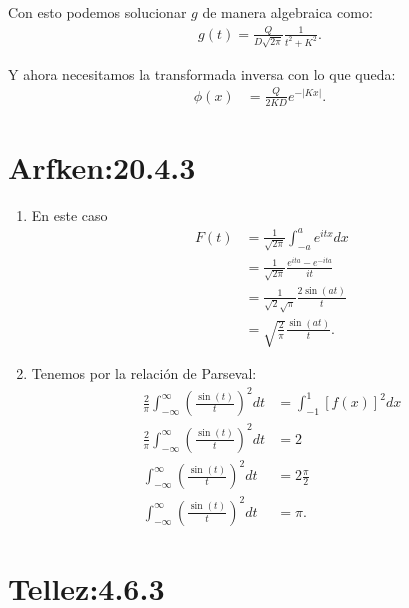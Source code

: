 \documentclass{report}
\begin{document}
Con esto podemos solucionar $g$ de manera algebraica como:
\begin{align*}
  g\left( t \right) = \frac{Q}{D\sqrt{2\pi} }\frac{1}{t^2 + K^2}
.\end{align*}

Y ahora necesitamos la transformada inversa con lo que queda:
\begin{align*}
  \phi\left( x \right) &= \frac{Q}{2K D}e^{-\left| Kx \right| }
.\end{align*}

\chapter{Arfken:20.4.3}

\begin{enumerate}
  \item En este caso
    \begin{align*}
      F\left( t \right) &= \frac{1}{\sqrt{2\pi} }\int_{-a}^{a} e^{itx}dx \\
      &= \frac{1}{\sqrt{2\pi} } \frac{e^{ita}- e^{-ita}}{it} \\
      &= \frac{1}{\sqrt{2} \sqrt{\pi} }\frac{2 \sin\left( at \right) }{t} \\
      &= \sqrt{\frac{2}{\pi}}\frac{\sin\left( at \right) }{t} 
    .\end{align*}
  \item Tenemos por la relación de Parseval:
    \begin{align*}
      \frac{2}{\pi}\int_{-\infty}^{\infty} \left( \frac{\sin\left( t \right) }{t} \right)^2 dt &= \int_{-1}^{1}\left[ f\left( x \right)  \right]^2 dx \\
      \frac{2}{\pi}\int_{-\infty}^{\infty} \left( \frac{\sin\left( t \right) }{t} \right)^2 dt &= 2\\
      \int_{-\infty}^{\infty} \left( \frac{\sin\left( t \right) }{t} \right)^2 dt &= 2 \frac{\pi}{2}\\
      \int_{-\infty}^{\infty} \left( \frac{\sin\left( t \right) }{t} \right)^2 dt &= \pi
    .\end{align*}
\end{enumerate}

\chapter{Tellez:4.6.3}
\end{document}
